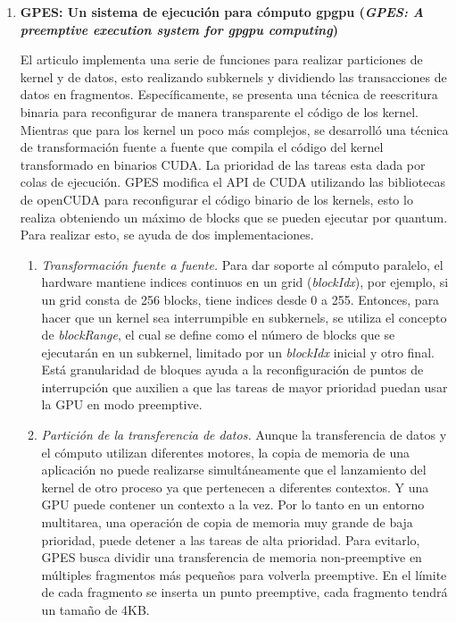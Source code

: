 \begin{enumerate}
\item \textbf{GPES: Un sistema de ejecución para cómputo gpgpu
	(\textit{GPES: A preemptive execution system for gpgpu computing})}
	
	El articulo \cite{GPES} implementa una serie de funciones para realizar particiones de kernel y de datos, esto realizando subkernels y dividiendo las transacciones de datos en fragmentos. 
Específicamente, se presenta una técnica de reescritura binaria para reconfigurar de manera transparente el código de los kernel. Mientras que para los kernel un poco más complejos, se desarrolló una técnica de transformación fuente a fuente que compila el código del kernel transformado en binarios CUDA. La prioridad de las tareas esta dada por colas de ejecución. GPES modifica el API de CUDA utilizando las bibliotecas de openCUDA para reconfigurar el código binario de los kernels, esto lo realiza obteniendo un máximo de blocks que se pueden ejecutar por quantum. Para realizar esto, se ayuda de dos implementaciones.

\begin{enumerate}
\item \textit{Transformación fuente a fuente.}
Para dar soporte al cómputo paralelo, el hardware mantiene indices continuos en un grid (\textit{blockIdx}), por ejemplo, si un grid consta de 256 blocks, tiene indices desde 0 a 255. Entonces, para hacer que un kernel sea interrumpible en subkernels, se utiliza el concepto de \textit{blockRange}, el cual se define como el número de blocks que se ejecutarán en un subkernel, limitado por un \textit{blockIdx} inicial y otro final. Está granularidad de bloques ayuda a la reconfiguración de puntos de interrupción que auxilien a que las tareas de mayor prioridad puedan usar la GPU en modo preemptive.

\item \textit{Partición de la transferencia de datos.}
Aunque la transferencia de datos y el cómputo utilizan diferentes motores, la copia de memoria de una aplicación no puede realizarse simultáneamente que el lanzamiento del kernel de otro proceso ya que pertenecen a diferentes contextos. Y una GPU puede contener un contexto a la vez. Por lo tanto en un entorno multitarea, una operación de copia de memoria muy grande de baja prioridad, puede detener a las tareas de alta prioridad. Para evitarlo, GPES busca dividir una transferencia de memoria non-preemptive en múltiples fragmentos más pequeños para volverla preemptive. En el límite de cada fragmento se inserta un punto preemptive, cada fragmento tendrá un tamaño de 4KB.


\end{enumerate}
\end{enumerate}
